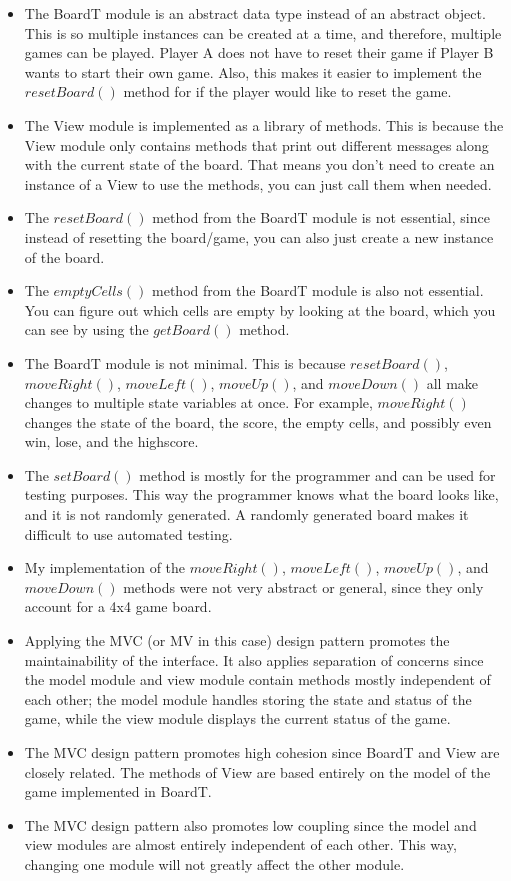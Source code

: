 \documentclass[12pt]{article}
\begin{document}
\begin{itemize}
  \item The BoardT module is an abstract data type instead of an abstract object. This is so multiple instances can be created at a time, and therefore, multiple games can be played. Player A does not have to reset their game if Player B wants to start their own game. Also, this makes it easier to implement the $resetBoard()$ method for if the player would like to reset the game.
  \item The View module is implemented as a library of methods. This is because the View module only contains methods that print out different messages along with the current state of the board. That means you don't need to create an instance of a View to use the methods, you can just call them when needed.
  \item The $resetBoard()$ method from the BoardT module is not essential, since instead of resetting the board/game, you can also just create a new instance of the board.
  \item The $emptyCells()$ method from the BoardT module is also not essential. You can figure out which cells are empty by looking at the board, which you can see by using the $getBoard()$ method.
  \item The BoardT module is not minimal. This is because $resetBoard()$, $moveRight()$, $moveLeft()$, $moveUp()$, and $moveDown()$ all make changes to multiple state variables at once. For example, $moveRight()$ changes the state of the board, the score, the empty cells, and possibly even win, lose, and the highscore.
  \item The $setBoard()$ method is mostly for the programmer and can be used for testing purposes. This way the programmer knows what the board looks like, and it is not randomly generated. A randomly generated board makes it difficult to use automated testing.
  \item My implementation of the $moveRight()$, $moveLeft()$, $moveUp()$, and $moveDown()$ methods were not very abstract or general, since they only account for a 4x4 game board.
  \item Applying the MVC (or MV in this case) design pattern promotes the maintainability of the interface. It also applies separation of concerns since the model module and view module contain methods mostly independent of each other; the model module handles storing the state and status of the game, while the view module displays the current status of the game.
  \item The MVC design pattern promotes high cohesion since BoardT and View are closely related. The methods of View are based entirely on the model of the game implemented in BoardT.
  \item The MVC design pattern also promotes low coupling since the model and view modules are almost entirely independent of each other. This way, changing one module will not greatly affect the other module.
  
\end{itemize}
\end{document}
